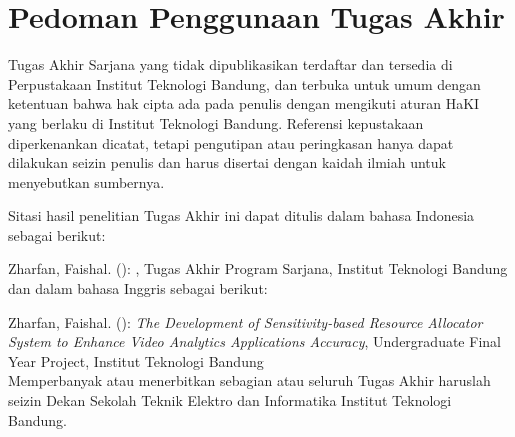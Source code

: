 \clearpage
\chapter*{Pedoman Penggunaan Tugas Akhir}

Tugas Akhir Sarjana yang tidak dipublikasikan terdaftar dan tersedia di Perpustakaan Institut Teknologi Bandung, dan terbuka untuk umum dengan ketentuan bahwa hak cipta ada pada penulis dengan mengikuti aturan HaKI yang berlaku di Institut Teknologi Bandung. Referensi kepustakaan diperkenankan dicatat, tetapi pengutipan atau peringkasan hanya dapat dilakukan seizin penulis dan harus disertai dengan kaidah ilmiah untuk menyebutkan sumbernya.

Sitasi hasil penelitian Tugas Akhir ini dapat ditulis dalam bahasa Indonesia sebagai berikut:

\hangindent=1.27cm Zharfan, Faishal. (\the\year): \textit{\thetitle}, Tugas Akhir Program Sarjana, Institut Teknologi Bandung\\

dan dalam bahasa Inggris sebagai berikut:

\hangindent=1.27cm Zharfan, Faishal. (\the\year): \textit{The Development of Sensitivity-based Resource Allocator 
System to Enhance Video Analytics Applications Accuracy}, Undergraduate Final Year Project, Institut Teknologi Bandung\\

Memperbanyak atau menerbitkan sebagian atau seluruh Tugas Akhir haruslah seizin Dekan Sekolah Teknik Elektro dan Informatika Institut Teknologi Bandung.

\clearpage